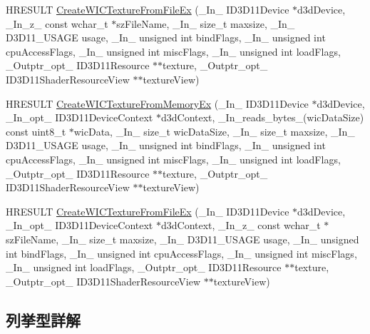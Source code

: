 \begin{DoxyCompactItemize}
\item 
H\+R\+E\+S\+U\+LT \mbox{\hyperlink{namespace_direct_x_af2065bbcfa2e7f066de9583dc7c3c61d}{Create\+W\+I\+C\+Texture\+From\+File\+Ex}} (\+\_\+\+In\+\_\+ I\+D3\+D11\+Device $\ast$d3d\+Device, \+\_\+\+In\+\_\+z\+\_\+ const wchar\+\_\+t $\ast$sz\+File\+Name, \+\_\+\+In\+\_\+ size\+\_\+t maxsize, \+\_\+\+In\+\_\+ D3\+D11\+\_\+\+U\+S\+A\+GE usage, \+\_\+\+In\+\_\+ unsigned int bind\+Flags, \+\_\+\+In\+\_\+ unsigned int cpu\+Access\+Flags, \+\_\+\+In\+\_\+ unsigned int misc\+Flags, \+\_\+\+In\+\_\+ unsigned int load\+Flags, \+\_\+\+Outptr\+\_\+opt\+\_\+ I\+D3\+D11\+Resource $\ast$$\ast$texture, \+\_\+\+Outptr\+\_\+opt\+\_\+ I\+D3\+D11\+Shader\+Resource\+View $\ast$$\ast$texture\+View)
\item 
H\+R\+E\+S\+U\+LT \mbox{\hyperlink{namespace_direct_x_ae20d2e1ac1ab3927c6bf8873b67e8b4b}{Create\+W\+I\+C\+Texture\+From\+Memory\+Ex}} (\+\_\+\+In\+\_\+ I\+D3\+D11\+Device $\ast$d3d\+Device, \+\_\+\+In\+\_\+opt\+\_\+ I\+D3\+D11\+Device\+Context $\ast$d3d\+Context, \+\_\+\+In\+\_\+reads\+\_\+bytes\+\_\+(wic\+Data\+Size) const uint8\+\_\+t $\ast$wic\+Data, \+\_\+\+In\+\_\+ size\+\_\+t wic\+Data\+Size, \+\_\+\+In\+\_\+ size\+\_\+t maxsize, \+\_\+\+In\+\_\+ D3\+D11\+\_\+\+U\+S\+A\+GE usage, \+\_\+\+In\+\_\+ unsigned int bind\+Flags, \+\_\+\+In\+\_\+ unsigned int cpu\+Access\+Flags, \+\_\+\+In\+\_\+ unsigned int misc\+Flags, \+\_\+\+In\+\_\+ unsigned int load\+Flags, \+\_\+\+Outptr\+\_\+opt\+\_\+ I\+D3\+D11\+Resource $\ast$$\ast$texture, \+\_\+\+Outptr\+\_\+opt\+\_\+ I\+D3\+D11\+Shader\+Resource\+View $\ast$$\ast$texture\+View)
\item 
H\+R\+E\+S\+U\+LT \mbox{\hyperlink{namespace_direct_x_add6a4b3cabfab65339e9816320bf2f5a}{Create\+W\+I\+C\+Texture\+From\+File\+Ex}} (\+\_\+\+In\+\_\+ I\+D3\+D11\+Device $\ast$d3d\+Device, \+\_\+\+In\+\_\+opt\+\_\+ I\+D3\+D11\+Device\+Context $\ast$d3d\+Context, \+\_\+\+In\+\_\+z\+\_\+ const wchar\+\_\+t $\ast$sz\+File\+Name, \+\_\+\+In\+\_\+ size\+\_\+t maxsize, \+\_\+\+In\+\_\+ D3\+D11\+\_\+\+U\+S\+A\+GE usage, \+\_\+\+In\+\_\+ unsigned int bind\+Flags, \+\_\+\+In\+\_\+ unsigned int cpu\+Access\+Flags, \+\_\+\+In\+\_\+ unsigned int misc\+Flags, \+\_\+\+In\+\_\+ unsigned int load\+Flags, \+\_\+\+Outptr\+\_\+opt\+\_\+ I\+D3\+D11\+Resource $\ast$$\ast$texture, \+\_\+\+Outptr\+\_\+opt\+\_\+ I\+D3\+D11\+Shader\+Resource\+View $\ast$$\ast$texture\+View)
\end{DoxyCompactItemize}


\subsection{列挙型詳解}
\mbox{\label{namespace_direct_x_ad1ef6b84995b08da5a29130bd8cc5c2a}} 
